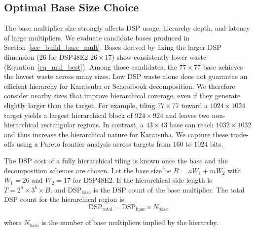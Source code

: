 \subsection{Optimal Base Size Choice}
The base multiplier size strongly affects DSP usage, hierarchy depth, and latency of large multipliers.
We evaluate candidate bases produced in Section~\ref{sec_build_base_mult}.
Bases derived by fixing the larger DSP dimension ($26$ for DSP48E2 $26\times17$) show consistently lower waste (Equation~\ref{eq_mul_best}).
Among those candidates, the $77\times77$ base achieves the lowest waste across many sizes.
Low DSP waste alone does not guarantee an efficient hierarchy for Karatsuba or Schoolbook decomposition.
We therefore consider nearby sizes that improve hierarchical coverage, even if they generate slightly larger than the target.
For example, tiling $77\times77$ toward a $1024\times1024$ target yields a largest hierarchical block of $924\times924$ and leaves two non-hierarchical rectangular regions.
In contrast, a $43\times43$ base can reach $1032\times1032$ and thus increase the hierarchical nature for Karatsuba.
We capture these trade-offs using a Pareto frontier analysis across targets from $160$ to $1024$ bits.




The DSP cost of a fully hierarchical tiling is known once the base and the decomposition schemes are chosen.
Let the base size be $B=nW_1+mW_2$ with $W_1=26$ and $W_2=17$ for DSP48E2.
If the hierarchical side length is $T=2^a\times 3^b\times B$, and 
$\text{DSP}_{\text{base}}$ is the DSP count of the base multiplier.
The total DSP count for the hierarchical region is
\begin{equation}
\text{DSP}_{\text{total}} = \text{DSP}_{\text{base}} \times N_{\text{base}}
\end{equation}

where $N_{\text{base}}$ is the number of base multipliers implied by the hierarchy.

